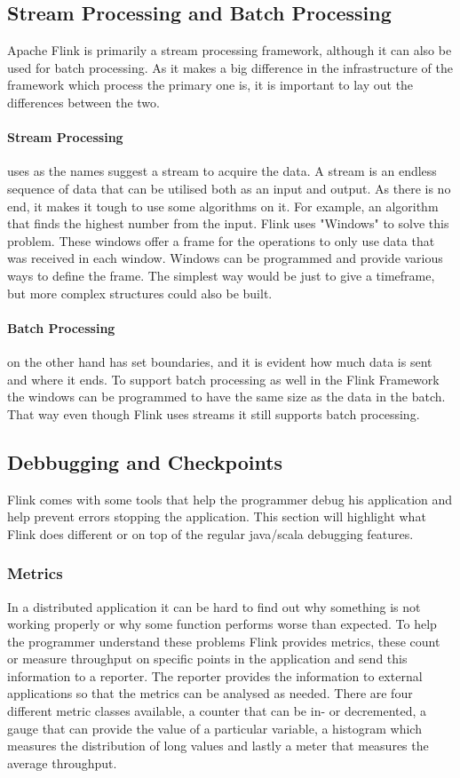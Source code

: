 \subsection{Stream Processing and Batch Processing}

Apache Flink is primarily a stream processing framework, although it can also be used for batch processing. As it makes a big difference in the infrastructure of the framework which process the primary one is, it is important to lay out the differences between the two.

\paragraph{Stream Processing} uses as the names suggest a stream to acquire the data. A stream is an endless sequence of data that can be utilised both as an input and output. As there is no end, it makes it tough to use some algorithms on it. For example, an algorithm that finds the highest number from the input. Flink uses "Windows" to solve this problem. These windows offer a frame for the operations to only use data that was received in each window. Windows can be programmed and provide various ways to define the frame. The simplest way would be just to give a timeframe, but more complex structures could also be built.

\paragraph{Batch Processing} on the other hand has set boundaries, and it is evident how much data is sent and where it ends. To support batch processing as well in the Flink Framework the windows can be programmed to have the same size as the data in the batch. That way even though Flink uses streams it still supports batch processing.

\subsection{Debbugging and Checkpoints}
\label{debuggingAndCheckpoints}
Flink comes with some tools that help the programmer debug his application and help prevent errors stopping the application. This section will highlight what Flink does different or on top of the regular java/scala debugging features.

\subsubsection{Metrics}
\label{metrics}
In a distributed application it can be hard to find out why something is not working properly or why some function performs worse than expected. To help the programmer understand these problems Flink provides metrics, these count or measure throughput on specific points in the application and send this information to a reporter. The reporter provides the information to external applications so that the metrics can be analysed as needed. There are four different metric classes available, a counter that can be in- or decremented, a gauge that can provide the value of a particular variable, a histogram which measures the distribution of long values and lastly a meter that measures the average throughput.

